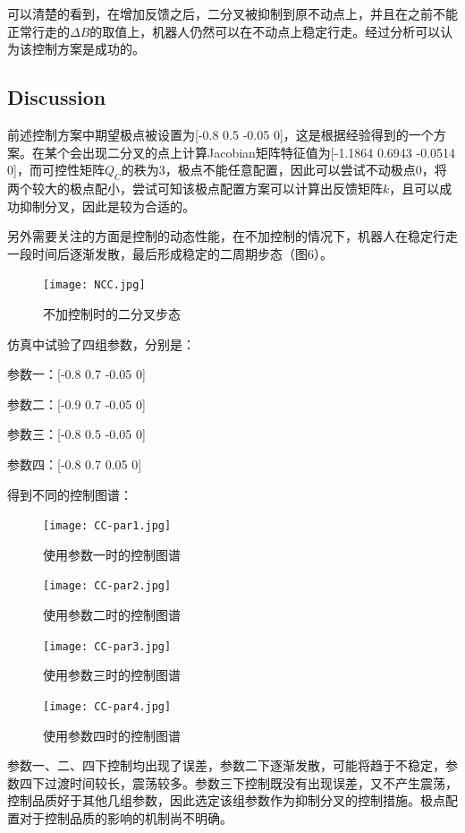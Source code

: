 \documentclass[UTF8]{ctexart}
\begin{document}
\par
可以清楚的看到，在增加反馈之后，二分叉被抑制到原不动点上，并且在之前不能正常行走的$\Delta B$的取值上，机器人仍然可以在不动点上稳定行走。经过分析可以认为该控制方案是成功的。\par
\subsection{Discussion}
前述控制方案中期望极点被设置为[-0.8 0.5 -0.05 0]，这是根据经验得到的一个方案。在某个会出现二分叉的点上计算Jacobian矩阵特征值为[-1.1864 0.6943 -0.0514 0]，而可控性矩阵$Q_{C}$的秩为3，极点不能任意配置，因此可以尝试不动极点0，将两个较大的极点配小，尝试可知该极点配置方案可以计算出反馈矩阵$k$，且可以成功抑制分叉，因此是较为合适的。\par
另外需要关注的方面是控制的动态性能，在不加控制的情况下，机器人在稳定行走一段时间后逐渐发散，最后形成稳定的二周期步态（图6）。\par
\begin{figure}[htbp]
\centerline{\texttt{[image: NCC.jpg]}}
\caption[]{不加控制时的二分叉步态}
\end{figure}
\par
仿真中试验了四组参数，分别是：\par
参数一：[-0.8 0.7 -0.05 0]\par
参数二：[-0.9 0.7 -0.05 0]\par
参数三：[-0.8 0.5 -0.05 0]\par
参数四：[-0.8 0.7 0.05 0]\par
得到不同的控制图谱：\par
\begin{figure}[htbp]
\centerline{\texttt{[image: CC-par1.jpg]}}
\caption[]{使用参数一时的控制图谱}
\end{figure}
\begin{figure}[htbp]
\centerline{\texttt{[image: CC-par2.jpg]}}
\caption[]{使用参数二时的控制图谱}
\end{figure}
\begin{figure}[htbp]
\centerline{\texttt{[image: CC-par3.jpg]}}
\caption[]{使用参数三时的控制图谱}
\end{figure}
\begin{figure}[htbp]
\centerline{\texttt{[image: CC-par4.jpg]}}
\caption[]{使用参数四时的控制图谱}
\end{figure}
\par
参数一、二、四下控制均出现了误差，参数二下逐渐发散，可能将趋于不稳定，参数四下过渡时间较长，震荡较多。参数三下控制既没有出现误差，又不产生震荡，控制品质好于其他几组参数，因此选定该组参数作为抑制分叉的控制措施。极点配置对于控制品质的影响的机制尚不明确。\par
\end{document}

